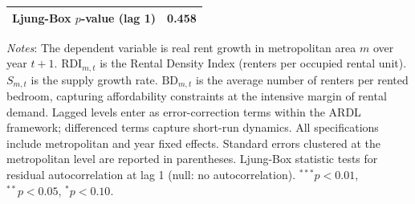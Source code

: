 \begin{table}[htbp]
\begin{tabular}{lc}
Ljung-Box $p$-value (lag 1)        & 0.458 \\
\bottomrule
\end{tabular}
\begin{flushleft}
\footnotesize
\textit{Notes}: The dependent variable is real rent growth in metropolitan area $m$ 
over year $t+1$. $\text{RDI}_{m,t}$ is the Rental Density Index (renters per occupied 
rental unit). $S_{m,t}$ is the supply growth rate. $\text{BD}_{m,t}$ is the average 
number of renters per rented bedroom, capturing affordability constraints at the 
intensive margin of rental demand. Lagged levels enter as error-correction terms 
within the ARDL framework; differenced terms capture short-run dynamics. All 
specifications include metropolitan and year fixed effects. Standard errors clustered 
at the metropolitan level are reported in parentheses. Ljung-Box statistic tests for 
residual autocorrelation at lag 1 (null: no autocorrelation). 
$^{***}p<0.01$, $^{**}p<0.05$, $^{*}p<0.10$.
\end{flushleft}
\end{table}